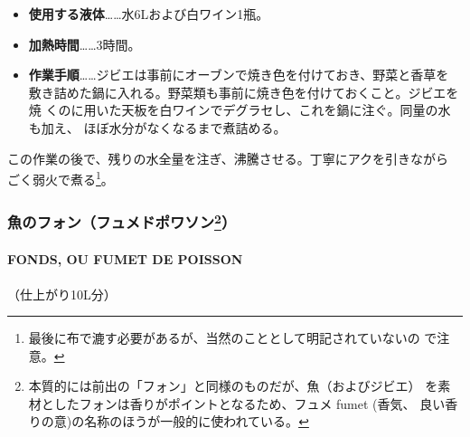 \documentclass[twoside,12Q,b5j]{escoffierltjsbook}
\newenvironment{recette}{\begin{small}\begin{spacing}{1}\begin{multicols}{2}}{\end{multicols}\end{spacing}\end{small}}
\begin{document}
\begin{recette}
\begin{itemize}
\item
  \textbf{使用する液体}\ldots{}\ldots{}水6Lおよび白ワイン1瓶。
\item
  \textbf{加熱時間}\ldots{}\ldots{}3時間。
\item
  \textbf{作業手順}\ldots{}\ldots{}ジビエは事前にオーブンで焼き色を付けておき、野菜と香草を
  敷き詰めた鍋に入れる。野菜類も事前に焼き色を付けておくこと。ジビエを焼
  くのに用いた天板を白ワインでデグラセし、これを鍋に注ぐ。同量の水も加え、
  ほぼ水分がなくなるまで煮詰める。
\end{itemize}

この作業の後で、残りの水全量を注ぎ、沸騰させる。丁寧にアクを引きながら
ごく弱火で煮る\footnote{最後に布で漉す必要があるが、当然のこととして明記されていないの
  で注意。}。

\vspace*{1.7\zw}

\subsubsection[魚のフォン（フュメドポワソン）]{\texorpdfstring{魚のフォン（フュメドポワソン\footnote{本質的には前出の「フォン」と同様のものだが、魚（およびジビエ）
  を素材としたフォンは香りがポイントとなるため、フュメ fumet (香気、
  良い香りの意)の名称のほうが一般的に使われている。}）}{魚のフォン（フュメドポワソン）}}\label{ux9b5aux306eux30d5ux30a9ux30f3ux30d5ux30e5ux30e1ux30c9ux30ddux30efux30bdux30f31010013}

\paragraph{FONDS, OU FUMET DE POISSON}\label{fonds-ou-fumet-de-poisson}


（仕上がり10L分）


\end{recette}
\end{document}
